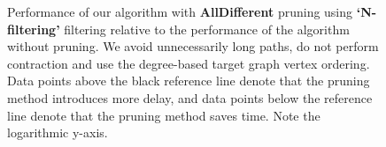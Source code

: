 \begin{figure}
\begin{subfigure} {0.5\linewidth}

\end{subfigure}

\caption{Performance of our algorithm with \textbf{AllDifferent} pruning using \textbf{`N-filtering'} filtering relative to the performance of the algorithm without pruning. We avoid unnecessarily long paths, do not perform contraction and use the degree-based target graph vertex ordering. Data points above the black reference line denote that the pruning method introduces more delay, and data points below the reference line denote that the pruning method saves time. Note the logarithmic y-axis.}		
\label{fig:alldifferentNfiltering}
\end{figure}





